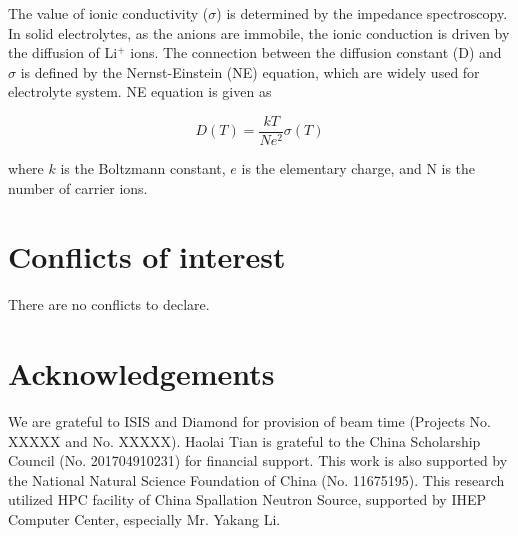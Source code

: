 \documentclass[twoside,twocolumn,9pt]{article}
\begin{document}
The value of ionic conductivity ($\sigma$) is determined by the impedance spectroscopy.
In solid electrolytes, as the anions are immobile, the ionic conduction is driven by the diffusion of Li$^+$ ions.
The connection between the diffusion constant (D) and $\sigma$ is defined by the Nernst-Einstein (NE) equation,
which are widely used for electrolyte system. NE equation is given as

\begin{equation}
D(T)=\frac{kT}{Ne^2}\sigma(T)
\end{equation}

where $k$ is the Boltzmann constant, $e$ is the elementary charge, and N is the number of carrier ions.

\section*{Conflicts of interest}
There are no conflicts to declare.

\section*{Acknowledgements}

We are grateful to ISIS and Diamond for provision of beam
time (Projects No. XXXXX and No. XXXXX). Haolai Tian is
grateful to the China Scholarship Council (No. 201704910231) for financial support.
This work is also supported by the National Natural Science Foundation of China (No. 11675195).
This research utilized HPC facility of China Spallation Neutron Source, supported by IHEP 
Computer Center, especially Mr. Yakang Li.



\balance


\end{document}
